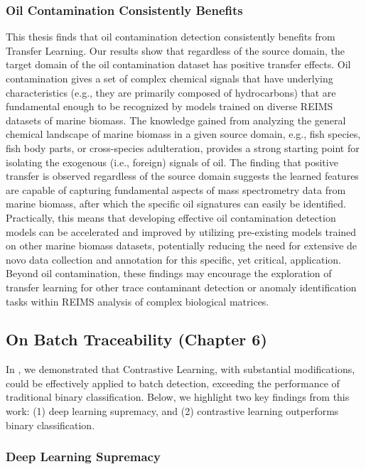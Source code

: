 \subsubsection{Oil Contamination Consistently Benefits}

This thesis finds that oil contamination detection consistently benefits from Transfer Learning. Our results show that regardless of the source domain, the target domain of the oil contamination dataset has positive transfer effects. Oil contamination gives a set of complex chemical signals that have underlying characteristics (e.g., they are primarily composed of hydrocarbons) that are fundamental enough to be recognized by models trained on diverse REIMS datasets of marine biomass. The knowledge gained from analyzing the general chemical landscape of marine biomass in a given source domain, e.g., fish species, fish body parts, or cross-species adulteration, provides a strong starting point for isolating the exogenous (i.e., foreign) signals of oil. The finding that positive transfer is observed regardless of the source domain suggests the learned features are capable of capturing fundamental aspects of mass spectrometry data from marine biomass, after which the specific oil signatures can easily be identified. Practically, this means that developing effective oil contamination detection models can be accelerated and improved by utilizing pre-existing models trained on other marine biomass datasets, potentially reducing the need for extensive de novo data collection and annotation for this specific, yet critical, application. Beyond oil contamination, these findings may encourage the exploration of transfer learning for other trace contaminant detection or anomaly identification tasks within REIMS analysis of complex biological matrices.

\subsection{On Batch Traceability (Chapter 6)}

In , we demonstrated that Contrastive Learning, with substantial modifications, could be effectively applied to batch detection, exceeding the performance of traditional binary classification. Below, we highlight two key findings from this work: (1) deep learning supremacy, and (2) contrastive learning outperforms binary classification.

\subsubsection{Deep Learning Supremacy}

